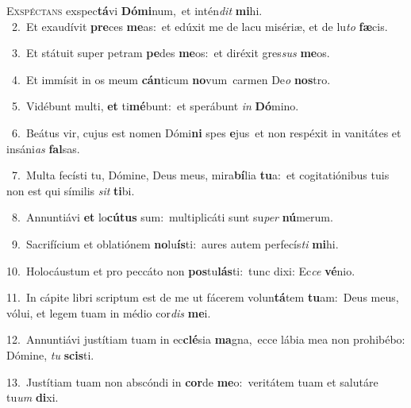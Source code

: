 \lettrine{\initial\textcolor{\initialcolor}{E}}{xspéctans} exspec\-\textbf{tá}\-vi \textbf{Dó}\-\textbf{mi}num,~\star et intén\textit{dit} \textbf{mi}\-hi.\\
{\numbfont\textcolor{\numbcolor}{~2.}}~Et exaudívit \textbf{pre}\-ces \textbf{me}\-as:~\star et edúxit me de lacu misériæ, et de lu\textit{to} \textbf{fæ}\-cis.\par
{\numbfont\textcolor{\numbcolor}{~3.}}~Et státuit super petram \textbf{pe}\-des \textbf{me}\-os:~\star et diréxit gres\textit{sus} \textbf{me}\-os.\par
{\numbfont\textcolor{\numbcolor}{~4.}}~Et immísit in os meum \textbf{cán}\-ticum \textbf{no}\-vum~\star carmen De\textit{o} \textbf{nos}\-tro.\par
{\numbfont\textcolor{\numbcolor}{~5.}}~Vidébunt multi, \textbf{et} ti\-\textbf{mé}\-bunt:~\star et sperábunt \textit{in} \textbf{Dó}\-mino.\par
{\numbfont\textcolor{\numbcolor}{~6.}}~Beátus vir, cujus est nomen Dómi\textbf{ni} spes \textbf{e}\-jus~\star et non respéxit in vanitátes et insáni\textit{as} \textbf{fal}\-sas.\par
{\numbfont\textcolor{\numbcolor}{~7.}}~Multa fecísti tu, Dómine, Deus meus, mira\-\textbf{bí}\-lia \textbf{tu}\-a:~\star et cogitatiónibus tuis non est qui símilis \textit{sit} \textbf{ti}\-bi.\par
{\numbfont\textcolor{\numbcolor}{~8.}}~Annuntiávi \textbf{et} lo\-\textbf{cú}\-\textbf{tus} sum:~\star multiplicáti sunt su\textit{per} \textbf{nú}\-merum.\par
{\numbfont\textcolor{\numbcolor}{~9.}}~Sacrifícium et oblatiónem \textbf{no}\-lu\-\textbf{ís}\-ti:~\star aures autem perfecís\textit{ti} \textbf{mi}\-hi.\par
{\numbfont\textcolor{\numbcolor}{10.}}~Holocáustum et pro peccáto non \textbf{pos}\-tu\-\textbf{lás}\-ti:~\star tunc dixi: Ec\textit{ce} \textbf{vé}\-nio.\par
{\numbfont\textcolor{\numbcolor}{11.}}~In cápite libri scriptum est de me ut fácerem volun\-\textbf{tá}\-tem \textbf{tu}\-am:~\star Deus meus, vólui, et legem tuam in médio cor\textit{dis} \textbf{me}\-i.\par
{\numbfont\textcolor{\numbcolor}{12.}}~Annuntiávi justítiam tuam in ec\-\textbf{clé}\-sia \textbf{ma}\-gna,~\star ecce lábia mea non prohibébo: Dómine, \textit{tu} \textbf{scis}\-ti.\par
{\numbfont\textcolor{\numbcolor}{13.}}~Justítiam tuam non abscóndi in \textbf{cor}\-de \textbf{me}\-o:~\star veritátem tuam et salutáre tu\textit{um} \textbf{di}\-xi.\par
